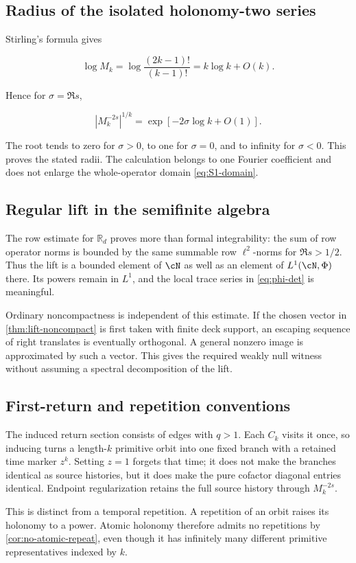 \subsection{Radius of the isolated holonomy-two series}

Stirling's formula gives

\[
 \log M_k
 =\log\frac{(2k-1)!}{(k-1)!}
 =k\log k+O(k).
\]

Hence for \(\sigma=\Re s\),

\[
 \left|M_k^{-2s}\right|^{1/k}
 =\exp[-2\sigma\log k+O(1)].
\]

The root tends to zero for \(\sigma>0\), to one for \(\sigma=0\), and to
infinity for \(\sigma<0\).  This proves the stated radii.  The calculation
belongs to one Fourier coefficient and does not enlarge the whole-operator
domain \cref{eq:S1-domain}.

\subsection{Regular lift in the semifinite algebra}

The row estimate for \(\mathbb R_d\) proves more than formal integrability:
the sum of row operator norms is bounded by the same summable row
\(\ell^2\)-norms for \(\Re s>1/2\).  Thus the lift is a bounded element of
\(\cN\) as well as an element of \(L^1(\cN,\Phi)\) there.  Its powers remain
in \(L^1\), and the local trace series in \cref{eq:phi-det} is meaningful.

Ordinary noncompactness is independent of this estimate.  If the chosen
vector in \cref{thm:lift-noncompact} is first taken with finite deck support,
an escaping sequence of right translates is eventually orthogonal.  A
general nonzero image is approximated by such a vector.  This gives the
required weakly null witness without assuming a spectral decomposition of
the lift.

\subsection{First-return and repetition conventions}

The induced return section consists of edges with \(q>1\).  Each \(C_k\)
visits it once, so inducing turns a length-\(k\) primitive orbit into one fixed
branch with a retained time marker \(z^k\).  Setting \(z=1\) forgets that
time; it does not make the branches identical as source histories, but it
does make the pure cofactor diagonal entries identical.  Endpoint
regularization retains the full source history through \(M_k^{-2s}\).

This is distinct from a temporal repetition.  A repetition of an orbit
raises its holonomy to a power.  Atomic holonomy therefore admits no
repetitions by \cref{cor:no-atomic-repeat}, even though it has infinitely many
different primitive representatives indexed by \(k\).

